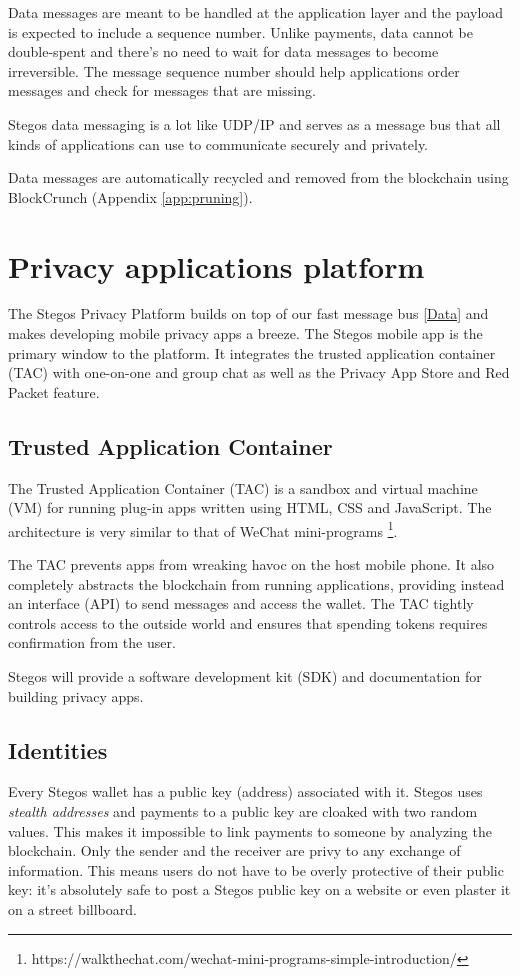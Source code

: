 \documentclass[8pt,fleqn,openany]{book}
\begin{document}
Data messages are meant to be handled at the application layer and the payload is expected to include a sequence number. Unlike payments, data cannot be double-spent and there’s no need to wait for data messages to become irreversible. The message sequence number should help applications order messages and check for messages that are missing. 

Stegos data messaging is a lot like UDP/IP and serves as a message bus that all kinds of applications can use to communicate securely and privately.

Data messages are automatically recycled and removed from the blockchain using BlockCrunch (Appendix \ref{app:pruning}).

\chapter{Privacy applications platform}\label{chap:privacy-app-platform}
The Stegos Privacy Platform builds on top of our fast message bus \ref{Data} and makes developing mobile privacy apps a breeze. The Stegos mobile app is the primary window to the platform. It integrates the trusted application container (TAC) with one-on-one and group chat as well as the Privacy App Store and Red Packet feature. 

\section{Trusted Application Container}\label{TAC}
The Trusted Application Container (TAC) is a sandbox and virtual machine (VM) for running plug-in apps written using HTML, CSS and JavaScript. The architecture is very similar to that of WeChat mini-programs \footnote{https://walkthechat.com/wechat-mini-programs-simple-introduction/}.

The TAC prevents apps from wreaking havoc on the host mobile phone. It also completely abstracts the blockchain from running applications, providing instead an interface (API) to send messages and access the wallet. The TAC tightly controls access to the outside world and ensures that spending tokens requires confirmation from the user. 

Stegos will provide a software development kit (SDK) and documentation for building privacy apps. 

\section{Identities}\label{Identities}
Every Stegos wallet has a public key (address) associated with it. Stegos uses \textit{stealth addresses} and payments to a public key are cloaked with two random values. This makes it impossible to link payments to someone by analyzing the blockchain. Only the sender and the receiver are privy to any exchange of information. This means users do not have to be overly protective of their public key: it’s absolutely safe to post a Stegos public key on a website or even plaster it on a street billboard. 
\end{document}

